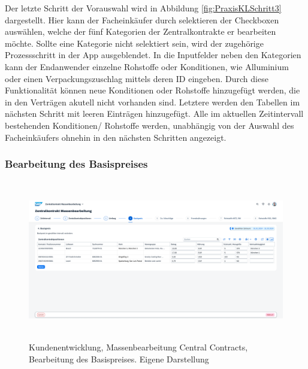 Der letzte Schritt der Vorauswahl wird in Abbildung \ref{fig:PraxisKLSchritt3} dargestellt. Hier kann der Facheinkäufer durch selektieren der Checkboxen auswählen, welche der fünf Kategorien der Zentralkontrakte er bearbeiten möchte. Sollte eine Kategorie nicht selektiert sein, wird der zugehörige Prozessschritt in der App ausgeblendet. In die Inputfelder neben den Kategorien kann der Endanwender einzelne Rohstoffe oder Konditionen, wie \zB Alluminium oder einen Verpackungszuschlag mittels deren ID eingeben. Durch diese Funktionalität können neue Konditionen oder Rohstoffe hinzugefügt werden, die in den Verträgen akutell nicht vorhanden sind. Letztere werden den Tabellen im nächsten Schritt mit leeren Einträgen hinzugefügt. Alle im aktuellen Zeitintervall bestehenden Konditionen/ Rohstoffe werden, unabhängig von der Auswahl des Facheinkäufers ohnehin in den nächsten Schritten angezeigt. 

\subsubsection{Bearbeitung des Basispreises}

\begin{figure}[H]
    \centering
    \includegraphics[height=6.99cm]{Bilder/Praxisteil-KL-Schritt-4.png}
    \caption[Kundenentwicklung, Massenbearbeitung Central Contracts, Bearbeitung des Basispreises]{Kundenentwicklung, Massenbearbeitung Central Contracts, Bearbeitung des Basispreises. Eigene Darstellung}
    \label{fig:PraxisKLSchritt4}
\end{figure}

